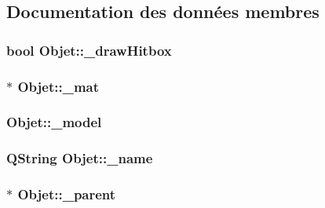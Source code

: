 \subsection{Documentation des données membres}
\hypertarget{class_objet_a953ad7ff9941575d1f18b6d256d2dcdc}{
\subsubsection[{\+\_\+draw\+Hitbox}]{\setlength{\rightskip}{0pt plus 5cm}bool Objet\+::\+\_\+draw\+Hitbox\hspace{0.3cm}{\ttfamily [protected]}}}\label{class_objet_a953ad7ff9941575d1f18b6d256d2dcdc}
\hypertarget{class_objet_aefea82be8c63504190ac63d5e44ff61a}{
\subsubsection[{\+\_\+mat}]{$\ast$ Objet\+::\+\_\+mat\hspace{0.3cm}{\ttfamily [protected]}}}\label{class_objet_aefea82be8c63504190ac63d5e44ff61a}
\hypertarget{class_objet_a1963cca59f62c7a6f69a9c2c461ad9ea}{
\subsubsection[{\+\_\+model}]{ Objet\+::\+\_\+model\hspace{0.3cm}{\ttfamily [protected]}}}\label{class_objet_a1963cca59f62c7a6f69a9c2c461ad9ea}
\hypertarget{class_objet_ac19f568a794dd9387386ee71914a868e}{
\subsubsection[{\+\_\+name}]{\setlength{\rightskip}{0pt plus 5cm}Q\+String Objet\+::\+\_\+name\hspace{0.3cm}{\ttfamily [protected]}}}\label{class_objet_ac19f568a794dd9387386ee71914a868e}
\hypertarget{class_objet_a91c5a50011c3fe9233a645aa767a275f}{
\subsubsection[{\+\_\+parent}]{$\ast$ Objet\+::\+\_\+parent\hspace{0.3cm}{\ttfamily [protected]}}}\label{class_objet_a91c5a50011c3fe9233a645aa767a275f}
